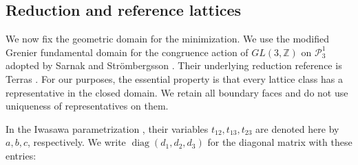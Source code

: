 \documentclass[reqno,english]{amsart}
\theoremstyle{definition}
\newtheorem{open problem}[theorem]{Open Problem}
\theoremstyle{remark}
\theoremstyle{plain}
\numberwithin{equation}{section}
\newcommand{\Z}{\mathbb Z}
\newcommand{\PP}{\mathcal P_3^1}
\newcommand{\diag}{\operatorname{diag}}
\begin{document}
\subsection{Reduction and reference lattices}\label{sec:reduced-representatives}
We now fix the geometric domain for the minimization. We use the
modified Grenier fundamental domain for the congruence action of
$GL(3,\Z)$ on $\PP$ adopted by Sarnak and Str\"ombergsson
\cite[Section~4, p.~15]{SS}. Their underlying reduction reference is
Terras \cite[Section~4.4.3, (4.34)]{TerrasII}. For our purposes, the
essential property is that every lattice class has a representative in
the closed domain. We retain all boundary faces and do not use
uniqueness of representatives on them.

In the Iwasawa parametrization \cite[(27)]{SS}, their variables
$t_{12},t_{13},t_{23}$ are denoted here by $a,b,c$, respectively.
We write $\diag(d_1,d_2,d_3)$ for the diagonal matrix with these entries:
\end{document}
